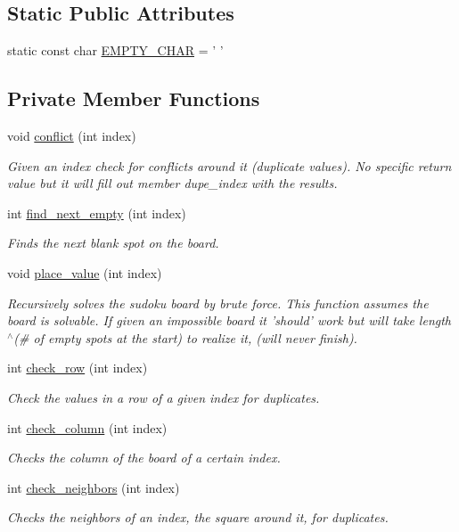 \subsection*{Static Public Attributes}
\begin{DoxyCompactItemize}
\item 
static const char \hyperlink{classSudoku_a86b04a41ba0123d8b64a662087f9657d}{E\-M\-P\-T\-Y\-\_\-\-C\-H\-A\-R} = ' '
\end{DoxyCompactItemize}
\subsection*{Private Member Functions}
\begin{DoxyCompactItemize}
\item 
void \hyperlink{classSudoku_a7ad0edcccfe6ac726e2d0a96a1a1bc31}{conflict} (int index)
\begin{DoxyCompactList}\small\item\em Given an index check for conflicts around it (duplicate values). No specific return value but it will fill out member dupe\-\_\-index with the results. \end{DoxyCompactList}\item 
int \hyperlink{classSudoku_ae0ca49e4fde30d74161b57f0add5a2f9}{find\-\_\-next\-\_\-empty} (int index)
\begin{DoxyCompactList}\small\item\em Finds the next blank spot on the board. \end{DoxyCompactList}\item 
void \hyperlink{classSudoku_a144ea29388385b796dd8e45c6cf297f4}{place\-\_\-value} (int index)
\begin{DoxyCompactList}\small\item\em Recursively solves the sudoku board by brute force. This function assumes the board is solvable. If given an impossible board it 'should' work but will take length$^\wedge$(\# of empty spots at the start) to realize it, (will never finish). \end{DoxyCompactList}\item 
int \hyperlink{classSudoku_af2bb86df1d5b8c0597adf2de7a025b56}{check\-\_\-row} (int index)
\begin{DoxyCompactList}\small\item\em Check the values in a row of a given index for duplicates. \end{DoxyCompactList}\item 
int \hyperlink{classSudoku_aa082f759b9ef10262eeb39291bfc5d62}{check\-\_\-column} (int index)
\begin{DoxyCompactList}\small\item\em Checks the column of the board of a certain index. \end{DoxyCompactList}\item 
int \hyperlink{classSudoku_ab1e1e8701c9a1b89e16c876c4a01c033}{check\-\_\-neighbors} (int index)
\begin{DoxyCompactList}\small\item\em Checks the neighbors of an index, the square around it, for duplicates. \end{DoxyCompactList}\end{DoxyCompactItemize}

